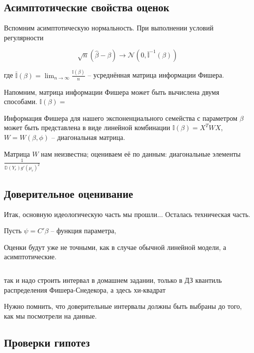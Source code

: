 \documentclass[main.tex]{subfiles}
\begin{document}
\subsection{Асимптотические свойства оценок}

Вспомним асимптотическую нормальность.
При выполнении условий регулярности

\[ \sqrt n (\hat \beta - \beta)  \to \mathcal N (0, \bar{\mathds I}^{-1} (\beta)) \]

где $ \bar {\mathds I } (\beta) = \lim_{ n \to \infty } \frac{ \mathds I (\beta)}{n} $ -- усреднённая матрица информации Фишера.

Напомним, матрица информации Фишера может быть вычислена двумя способами.
$ \mathds I(\beta) =  $


Информация Фишера для нашего экспоненциального семейства с параметром $ \beta $ может быть представлена в виде линейной комбинации $ \mathds I (\beta) = X^T W X $, $ W = W(\beta, \phi) $ -- диагональная матрица.

Матрица $ W $ нам неизвестна; оцениваем её по данным: диагональные элементы $ \frac{1}{ \mathds D (Y_r) g'(\mu_r)^2 } $

\subsection{Доверительное оценивание}

Итак, основную идеологическую часть мы прошли...
Осталась техническая часть.

Пусть $ \psi = C' \beta $ -- функция параметра,


Оценки будут уже не точными, как в случае обычной линейной модели, а асимптотические.

\[  \] %

\begin{leftbar}
	так и надо строить интервал в домашнем задании,  только в ДЗ квантиль распределения Фишера-Снедекора, а здесь хи-квадрат
\end{leftbar}
 
Нужно помнить, что доверительные интервалы должны быть выбраны до того, как мы посмотрели на данные.

\subsection{Проверки гипотез}
\end{document}
